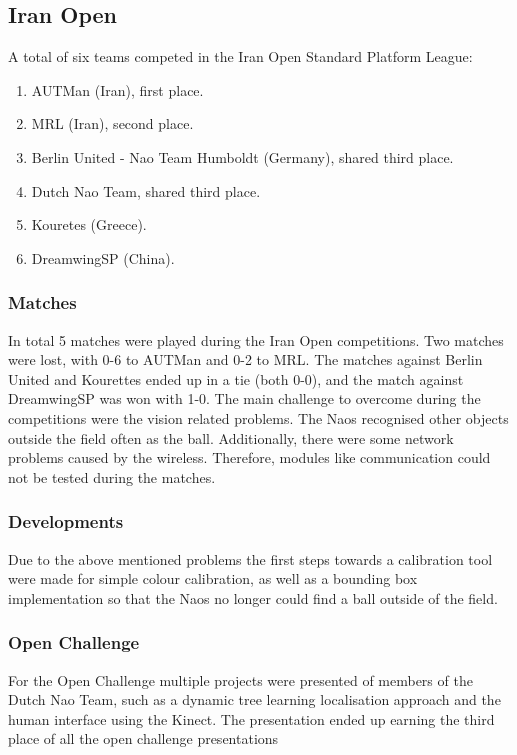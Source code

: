 \documentclass[a4paper]{article}
\begin{document}
\subsection{Iran Open}

A total of six teams competed in the Iran Open Standard Platform League:
\begin{enumerate}
\item AUTMan (Iran), first place.
\item MRL (Iran), second place.
\item Berlin United - Nao Team Humboldt (Germany), shared third place.
\item Dutch Nao Team, shared third place.
\item Kouretes (Greece).
\item DreamwingSP (China).
\end{enumerate}

\subsubsection{Matches}
In total 5 matches were played during the Iran Open competitions. Two matches were lost, with 0-6 to AUTMan and 0-2 to MRL. The matches against Berlin United and Kourettes ended up in a tie (both 0-0), and the match against DreamwingSP was won with 1-0. The main challenge to overcome during the competitions were the vision related problems. The Naos recognised other objects outside the field often as the ball. Additionally, there were some network problems caused by the wireless. Therefore, modules like communication could not be tested during the matches.

\subsubsection{Developments}
Due to the above mentioned problems the first steps towards a calibration tool were made for simple colour calibration, as well as a bounding box implementation so that the Naos no longer could find a ball outside of the field.

\subsubsection{Open Challenge}
For the Open Challenge multiple projects were presented of members of the Dutch Nao Team, such as a dynamic tree learning localisation approach and the human interface using the Kinect\cite{DutchNaoTeamTech11}. The presentation ended up earning the third place of all the open challenge presentations
\end{document}
